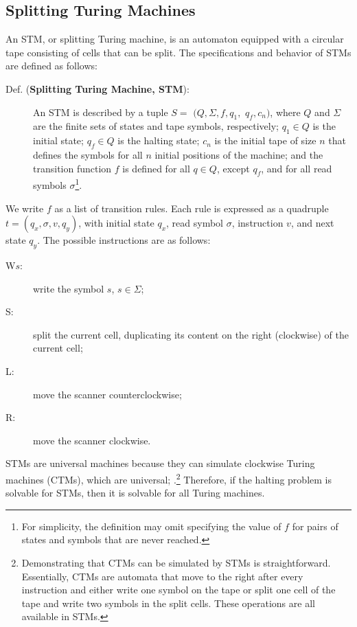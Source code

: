 \documentclass[%
  manuscript=article,   %
  year=2024,
  volume=77,
  doi=00000.000,
]{zfn}
\begin{document}
\subsection{Splitting Turing Machines}\label{STMsec}

An STM, or splitting Turing machine, is an automaton equipped with a circular tape consisting of cells that can be split. The specifications and behavior of STMs are defined as follows:

\begin{description}
\item[Def. (\textbf{Splitting Turing Machine, STM}):] An \label{DefSTM} STM is described by a tuple $S =$ $(Q, \Sigma, f, q_1,$ $q_f, c_n)$, where $Q$ and $\Sigma$ are the finite sets of states and tape symbols, respectively; $q_1\in Q$ is the initial state; $q_f \in Q$ is the halting state; $c_n$ is the initial tape of size $n$ that defines the symbols for all $n$ initial positions of the machine; and the transition function $f$
is defined for all $q\in Q$, except $q_f$, and for all read symbols $\sigma$\footnote{For simplicity, the definition may omit specifying the value of $f$ for pairs of states and symbols that are never reached.}.
\end{description}

We write $f$ as a list of transition rules. Each rule is expressed as a quadruple $t = (q_x, \sigma, v, q_y)$, with initial state $q_x$, read symbol $\sigma$, instruction $v$, and next state $q_y$. The possible instructions are as follows:

\begin{description}
\item[W$s$:] write the symbol $s$, $s \in \Sigma$;
\item[S:] split the current cell, duplicating its content on the right (clockwise) of the current cell;
\item[L:] move the scanner counterclockwise;
\item[R:] move the scanner clockwise.
\end{description}

STMs are universal machines because they can simulate clockwise Turing machines (CTMs), which are universal; \parencite[cf.][pp.107-109]{Neary}.\footnote{Demonstrating that CTMs can be simulated by STMs is straightforward. Essentially, CTMs are automata that move to the right after every instruction and either write one symbol on the tape or split one cell of the tape and write two symbols in the split cells. These operations are all available in STMs.} Therefore, if the halting problem is solvable for STMs, then it is solvable for all Turing machines.
\end{document}
